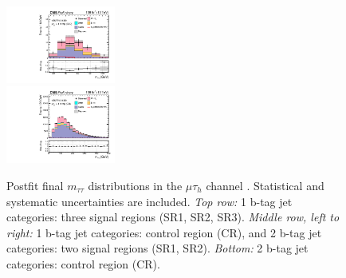 \begin{figure}[ht]
\begin{center}
        \includegraphics[width=0.32\textwidth]{figures/ch-10-results/mt_all_6_post_prelim-yes.pdf}\\
        \includegraphics[width=0.32\textwidth]{figures/ch-10-results/mt_all_7_post_prelim-yes.pdf}
    \end{center}
    \caption[Postfit final $m_{\tau\tau}$ distributions in the $\mu\tau_{h}$ channel.]{Postfit final $m_{\tau\tau}$ distributions in the $\mu\tau_{h}$ channel \cite{CMS-AN-20-213}. Statistical and systematic uncertainties are included. \textit{Top row:} 1 b-tag jet categories: three signal regions (SR1, SR2, SR3). \textit{Middle row, left to right:} 1 b-tag jet categories: control region (CR), and 2 b-tag jet categories: two signal regions (SR1, SR2). \textit{Bottom:} 2 b-tag jet categories: control region (CR).}
    \label{fig:results_mtt_postfit_mtall}
\end{figure}

